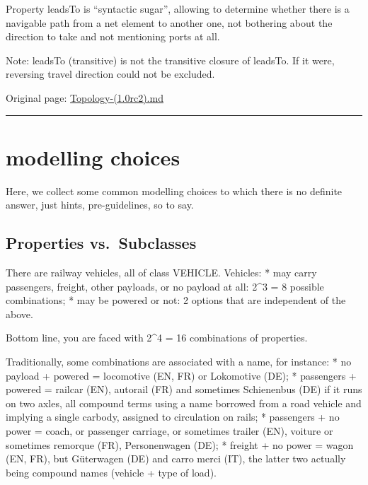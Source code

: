 \documentclass[
  11pt,
]{article}
\begin{document}
Property leadsTo is ``syntactic sugar'', allowing to determine whether
there is a navigable path from a net element to another one, not
bothering about the direction to take and not mentioning ports at all.

Note: leadsTo (transitive) is not the transitive closure of leadsTo. If
it were, reversing travel direction could not be excluded.

Original page:
\href{https://github.com/UICrail/CDM-RSM/wiki/Topology-\%281.0rc2\%29}{Topology-(1.0rc2).md}

\begin{center}\rule{0.5\linewidth}{0.5pt}\end{center}

\hypertarget{modelling-choices}{%
\section{modelling choices}\label{modelling-choices}}

Here, we collect some common modelling choices to which there is no
definite answer, just hints, pre-guidelines, so to say.

\hypertarget{properties-vs.-subclasses}{%
\subsection{Properties vs.~Subclasses}\label{properties-vs.-subclasses}}

There are railway vehicles, all of class VEHICLE. Vehicles: * may carry
passengers, freight, other payloads, or no payload at all: 2\^{}3 = 8
possible combinations; * may be powered or not: 2 options that are
independent of the above.

Bottom line, you are faced with 2\^{}4 = 16 combinations of properties.

Traditionally, some combinations are associated with a name, for
instance: * no payload + powered = locomotive (EN, FR) or Lokomotive
(DE); * passengers + powered = railcar (EN), autorail (FR) and sometimes
Schienenbus (DE) if it runs on two axles, all compound terms using a
name borrowed from a road vehicle and implying a single carbody,
assigned to circulation on rails; * passengers + no power = coach, or
passenger carriage, or sometimes trailer (EN), voiture or sometimes
remorque (FR), Personenwagen (DE); * freight + no power = wagon (EN,
FR), but Güterwagen (DE) and carro merci (IT), the latter two actually
being compound names (vehicle + type of load).
\end{document}
